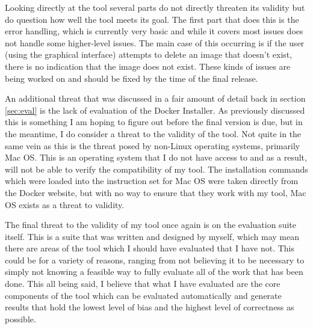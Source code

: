 Looking directly at the tool several parts do not directly threaten its validity but do question how well the tool meets its goal. The first part that does this is the error handling, which is currently very basic and while it covers most issues does not handle some higher-level issues. The main case of this occurring is if the user (using the graphical interface) attempts to delete an image that doesn't exist, there is no indication that the image does not exist. These kinds of issues are being worked on and should be fixed by the time of the final release.

An additional threat that was discussed in a fair amount of detail back in section \ref{sec:eval} is the lack of evaluation of the Docker Installer. As previously discussed this is something I am hoping to figure out before the final version is due, but in the meantime, I do consider a threat to the validity of the tool. Not quite in the same vein as this is the threat posed by non-Linux operating systems, primarily Mac OS. This is an operating system that I do not have access to and as a result, will not be able to verify the compatibility of my tool. The installation commands which were loaded into the instruction set for Mac OS were taken directly from the Docker website, but with no way to ensure that they work with my tool, Mac OS exists as a threat to validity.

The final threat to the validity of my tool once again is on the evaluation suite itself. This is a suite that was written and designed by myself, which may mean there are areas of the tool which I should have evaluated that I have not. This could be for a variety of reasons, ranging from not believing it to be necessary to simply not knowing a feasible way to fully evaluate all of the work that has been done. This all being said, I believe that what I have evaluated are the core components of the tool which can be evaluated automatically and generate results that hold the lowest level of bias and the highest level of correctness as possible.

